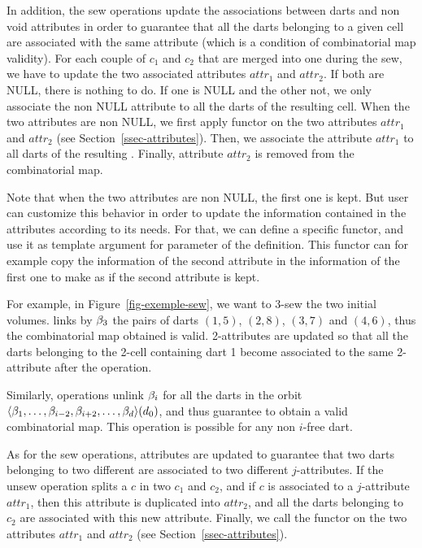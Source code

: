 In addition, the sew operations update the associations between darts
and non void attributes in order to guarantee that all the darts
belonging to a given cell are associated with the same attribute
(which is a condition of combinatorial map validity).  For each couple
of  $c_1$ and $c_2$ that are merged into one  during
the sew, we have to update the two associated attributes $attr_1$ and
$attr_2$.  If both are NULL, there is nothing to do.  If one is NULL
and the other not, we only associate the non NULL attribute to all the
darts of the resulting cell.  When the two attributes are non NULL, we
first apply functor  on the two attributes $attr_1$ and
$attr_2$ (see Section~\ref{ssec-attributes}). Then, we associate the
attribute $attr_1$ to all darts of the resulting . Finally,
attribute $attr_2$ is removed from the combinatorial map. 

Note that when the two attributes are non NULL, the first one is
kept. But user can customize this behavior in order to update the
information contained in the attributes according to its needs.  For
that, we can define a specific functor, and use it as template
argument for  parameter of the 
definition. This functor can for example copy the information of the
second attribute in the information of the first one to make as if the
second attribute is kept.

For example, in Figure~\ref{fig-exemple-sew}, we want to 3-sew the two
initial volumes.  links by $\beta_{3}$ the pairs of
darts $(1,5)$, $(2,8)$, $(3,7)$ and $(4,6)$, thus the combinatorial map
obtained is valid. 2-attributes are updated so that all the darts
belonging to the 2-cell containing dart 1 become associated to the
same 2-attribute after the operation.
%

Similarly,  operations unlink $\beta_{i}$ for all the darts
in the orbit $\langle{}\beta_{1},\ldots,\beta_{i-2},\beta_{i+2},\ldots,\beta_{d}\rangle{}(d_0)$, 
and thus guarantee to obtain a valid combinatorial map.  This
operation is possible for any non $i$-free dart.

As for the sew operations, attributes are updated to
guarantee that two darts belonging to two different  are
associated to two different $j$-attributes.  If the unsew operation
splits a  $c$ in two  $c_1$ and $c_2$, and if $c$ is
associated to a $j$-attribute $attr_1$, then this attribute is duplicated
into $attr_2$, and all the darts belonging to $c_2$ are associated
with this new attribute.  Finally, we call the functor 
on the two attributes $attr_1$ and $attr_2$ (see
Section~\ref{ssec-attributes}).


